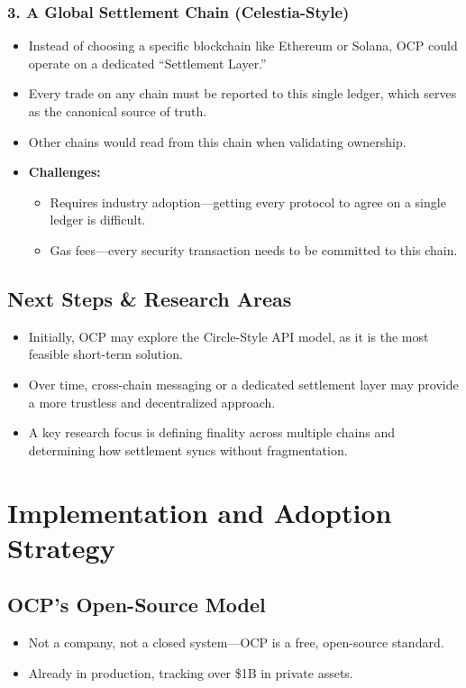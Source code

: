 \documentclass[11pt,a4paper]{article}
\begin{document}
\subsubsection{3. A Global Settlement Chain (Celestia-Style)}
\begin{itemize}
    \item Instead of choosing a specific blockchain like Ethereum or Solana, OCP could operate on a dedicated ``Settlement Layer.''
    \item Every trade on any chain must be reported to this single ledger, which serves as the canonical source of truth.
    \item Other chains would read from this chain when validating ownership.
    \item \textbf{Challenges:}
    \begin{itemize}
        \item Requires industry adoption---getting every protocol to agree on a single ledger is difficult.
        \item Gas fees---every security transaction needs to be committed to this chain.
    \end{itemize}
\end{itemize}

\subsection{Next Steps \& Research Areas}
\begin{itemize}
    \item Initially, OCP may explore the Circle-Style API model, as it is the most feasible short-term solution.
    \item Over time, cross-chain messaging or a dedicated settlement layer may provide a more trustless and decentralized approach.
    \item A key research focus is defining finality across multiple chains and determining how settlement syncs without fragmentation.
\end{itemize}

\section{Implementation and Adoption Strategy}
\subsection{OCP’s Open-Source Model}
\begin{itemize}
    \item Not a company, not a closed system—OCP is a free, open-source standard.
    \item Already in production, tracking over \$1B in private assets.
\end{itemize}
\end{document}
